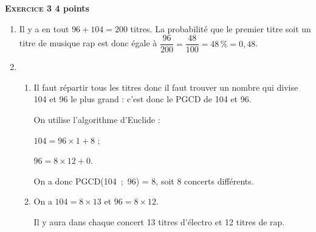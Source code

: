 \textbf{\textsc{Exercice 3} \hfill 4 points}

\medskip

%

\begin{enumerate}
\item %
Il y a en tout $96 + 104 = 200$ titres. La probabilité que le premier titre soit un titre de musique rap est donc égale à $\dfrac{96}{200} = \dfrac{48}{100} = 48\,\%= 0,48$.
\item %
	\begin{enumerate}
		\item %
Il faut répartir tous les titres donc il faut trouver un nombre qui divise 104 et 96 le plus grand : c'est donc le PGCD de 104 et 96.

On utilise l'algorithme d'Euclide :

$104 = 96 \times 1 + 8$ ;

$96 = 8 \times 12 + 0$.

On a donc PGCD(104~;~96) = 8, soit 8 concerts différents.
		\item %
On a $104 = 8 \times 13$ et $96 = 8 \times 12$.

Il y aura dans chaque concert 13 titres d'électro et 12 titres de rap.
	\end{enumerate}
\end{enumerate}
\vspace{0.25cm}

